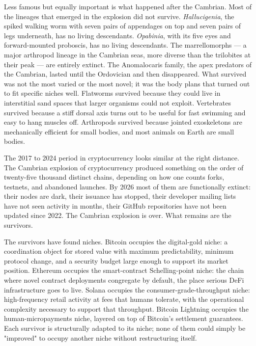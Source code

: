 \documentclass[11pt,a4paper]{article}
\begin{document}
Less famous but equally important is what happened after the Cambrian.
Most of the lineages that emerged in the explosion did not survive.
\emph{Hallucigenia}, the spiked walking worm with seven pairs of
appendages on top and seven pairs of legs underneath, has no living
descendants. \emph{Opabinia}, with its five eyes and forward-mounted
proboscis, has no living descendants. The marrellomorphs --- a major
arthropod lineage in the Cambrian seas, more diverse than the
trilobites at their peak --- are entirely extinct. The Anomalocaris
family, the apex predators of the Cambrian, lasted until the Ordovician
and then disappeared. What survived was not the most varied or the most
novel; it was the body plans that turned out to fit specific niches well.
Flatworms survived because they could live in interstitial sand spaces
that larger organisms could not exploit. Vertebrates survived because a
stiff dorsal axis turns out to be useful for fast swimming and easy to
hang muscles off. Arthropods survived because jointed exoskeletons are
mechanically efficient for small bodies, and most animals on Earth are
small bodies.

The 2017 to 2024 period in cryptocurrency looks similar at the right
distance. The Cambrian explosion of cryptocurrency produced something on
the order of twenty-five thousand distinct chains, depending on how one
counts forks, testnets, and abandoned launches. By 2026 most of them are
functionally extinct: their nodes are dark, their issuance has stopped,
their developer mailing lists have not seen activity in months, their
GitHub repositories have not been updated since 2022. The Cambrian
explosion is over. What remains are the survivors.

The survivors have found niches. Bitcoin occupies the digital-gold niche:
a coordination object for stored value with maximum predictability,
minimum protocol change, and a security budget large enough to support
its market position. Ethereum occupies the smart-contract Schelling-point
niche: the chain where novel contract deployments congregate by default,
the place serious DeFi infrastructure goes to live. Solana occupies the
consumer-grade-throughput niche: high-frequency retail activity at fees
that humans tolerate, with the operational complexity necessary to
support that throughput. Bitcoin Lightning occupies the
human-micropayments niche, layered on top of Bitcoin's settlement
guarantees. Each survivor is structurally adapted to its niche; none of
them could simply be "improved" to occupy another niche without
restructuring itself.
\end{document}

